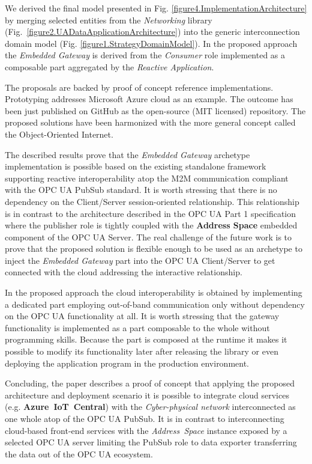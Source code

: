 \documentclass[runningheads]{llncs}
\begin{document}
We derived the final model presented in Fig. \ref{figure4.ImplementationArchitecture} by merging selected entities from the \emph{Networking} library (Fig.~\ref{figure2.UADataApplicationArchitecture}) into the generic interconnection domain model (Fig. \ref{figure1.StrategyDomainModel}). In the proposed approach the \emph{Embedded Gateway} is derived from the \emph{Consumer} role implemented as a composable part aggregated by the \emph{Reactive Application}.

The proposals are backed by proof of concept reference implementations. Prototyping addresses Microsoft Azure cloud as an example. The outcome has been just published on GitHub as the open-source (MIT licensed) repository. The proposed solutions have been harmonized with the more general concept called the Object-Oriented Internet.

The described results prove that the \emph{Embedded Gateway} archetype implementation is possible based on the existing standalone framework supporting reactive interoperability atop the M2M communication compliant with the OPC UA PubSub standard. It is worth stressing that there is no dependency on the Client/Server session-oriented relationship. This relationship is in contrast to the architecture described in the OPC UA Part 1 \cite{OPCUAPart1} specification where the publisher role is tightly coupled with the \textbf{Address Space} \cite{RefWorks:doc:5ac86c97e4b009947bbb8728} embedded component of the OPC UA Server. The real challenge of the future work is to prove that the proposed solution is flexible enough to be used as an archetype to inject the \emph{Embedded Gateway} part into the OPC UA Client/Server to get connected with the cloud addressing the interactive relationship.

In the proposed approach the cloud interoperability is obtained by implementing a dedicated part employing out-of-band communication only without dependency on the OPC UA functionality at all. It is worth stressing that the gateway functionality is implemented as a part composable to the whole without programming skills. Because the part is composed at the runtime it makes it possible to modify its functionality later after releasing the library or even deploying the application program in the production environment.

Concluding, the paper describes a proof of concept that applying the proposed architecture and deployment scenario it is possible to integrate cloud services (e.g. \textbf{Azure\ IoT\ Central}) with the \emph{Cyber-physical network} interconnected as one whole atop of the OPC UA PubSub. It is in contrast to interconnecting cloud-based front-end services with the \emph{ Address\ Space} instance exposed by a selected OPC UA server limiting the PubSub role to data exporter transferring the data out of the OPC UA ecosystem.



\end{document}
